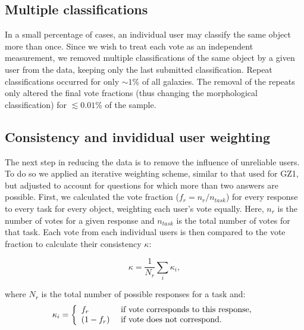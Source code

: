 \documentclass[useAMS,usenatbib]{mn2e}
\begin{document}
\subsection{Multiple classifications}
In a small percentage of cases, an individual user may classify the same object more than once. Since we wish to treat each vote as an independent measurement, we removed multiple classifications of the same object by a given user from the data, keeping only the last submitted classification. Repeat classifications occurred for only $\sim1\%$ of all galaxies. The removal of the repeats only altered the final vote fractions (thus changing the morphological classification) for $\lesssim0.01\%$ of the sample.  


\subsection{Consistency and invididual user weighting}\label{ssec-consistency}

The next step in reducing the data is to remove the influence of unreliable users. To do so we applied an iterative weighting scheme, similar to that used for GZ1, but adjusted to account for questions for which more than two answers are possible. First, we calculated the vote fraction ($f_r = n_{r}/n_{task}$) for every response to every task for every object, weighting each user's vote equally. Here, $n_r$ is the number of votes for a given response and $n_{task}$ is the total number of votes for that task. Each vote from each individual users is then compared to the vote fraction to calculate their consistency $\kappa$:

\begin{equation}
\kappa = \frac{1}{N_r}\sum_i{\kappa_i},
\label{eqn-consistency}
\end{equation}

where $N_r$ is the total number of possible responses for a task and: 
\begin{equation}
    \kappa_i = \left\{
    \begin{array}{l l}
      f_r       & \text{ if vote corresponds to this response,} \\
      (1 - f_r) & \text{ if vote does not correspond.}\\
    \end{array} \right.
    \label{eqn-consistency2}
 \end{equation}
\end{document}
